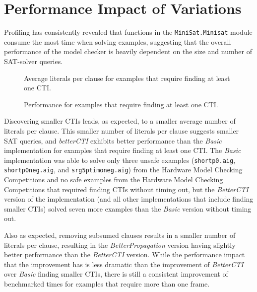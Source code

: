 \documentclass[12pt,a4paper,twoside,openright]{report}
\begin{document}
{\section{Performance Impact of Variations}

Profiling has consistently revealed that functions in the \verb,MiniSat.Minisat, module consume the most time
when solving examples, suggesting that the overall performance of the model checker is heavily dependent on the
size and number of SAT-solver queries.

\begin{figure}[!ht]
\caption{Average literals per clause for examples that require finding at least one CTI.}
\end{figure}

\begin{figure}[!ht]
\caption{Performance for examples that require finding at least one CTI.}
\end{figure}


Discovering smaller CTIs leads, as expected, to a smaller average number of literals per clause. This
smaller number of literals per clause suggests smaller SAT queries, and {\it betterCTI} exhibits
better performance than the {\it Basic} implementation for examples
that require finding at least one CTI. The {\it Basic} implementation was able
to solve only three unsafe examples (\verb,shortp0.aig,, \verb,shortp0neg.aig,, and \verb,srg5ptimoneg.aig,)
from the Hardware Model Checking Competitions and no safe examples from the Hardware Model Checking Competitions
that required finding CTIs without timing out, but the \emph{BetterCTI} version of the implementation
(and all other implementations that include finding smaller CTIs)
solved seven more examples than the \emph{Basic} version without timing out.


Also as expected, removing subsumed clauses results in a smaller number of literals per clause, resulting in
the \emph{BetterPropagation} version having slightly better performance than the \emph{BetterCTI} version.
While the performance impact that the improvement has is less dramatic than the improvement of \emph{BetterCTI}
over \emph{Basic} finding smaller CTIs, there is still a consistent improvement of benchmarked times for
examples that require more than one frame.

}
\end{document}
